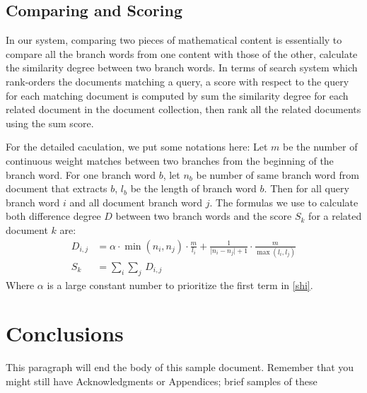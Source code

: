 \documentclass{acm_proc_article-sp}
\begin{document}
\subsection{Comparing and Scoring}
In our system, comparing two pieces of mathematical content is essentially to compare all the branch words from one content with those of the other, calculate the similarity degree between two branch words. In terms of search system which rank-orders the documents matching a query, a score with respect to the query for each matching document is computed by sum the similarity degree for each related document in the document collection, then rank all the related documents using the sum score.

For the detailed caculation, we put some notations here: Let $m$ be the number of continuous weight matches between two branches from the beginning of the branch word. For one branch word $b$, let $n_b$ be number of same branch word from document that extracts $b$, $l_b$ be the length of branch word $b$. Then for all query branch word $i$ and all document branch word $j$. The formulas we use to calculate both difference degree $D$ between two branch words and the score $S_k$ for a related document $k$ are:
\begin{align}
\label{shi}
D_{i,j} &= \alpha \cdot \min(n_i, n_j) \cdot \frac{m}{l_i} + \frac{1}{\lvert n_i - n_j \rvert + 1} \cdot \frac{m}{\max(l_i, l_j)} \\
S_k &= \sum_{i}\sum_{j}\,D_{i,j}
\end{align}
Where $\alpha$ is a large constant number to prioritize the first term in \eqref{shi}.

\section{Conclusions}
This paragraph will end the body of this sample document.
Remember that you might still have Acknowledgments or
Appendices; brief samples of these


\end{document}
